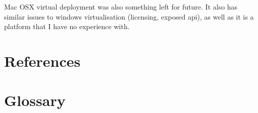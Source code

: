 \documentclass{article}
\begin{document}
Mac OSX virtual deployment was also something left for future. It also has similar issues to windows virtualisation (licensing, exposed \gls{api}), as well as it is a platform that I have no experience with.

\newpage
\section{References}


\renewcommand{\bibname}{}

\newpage
\section{Glossary}
\printglossary
\newpage
\end{document}
